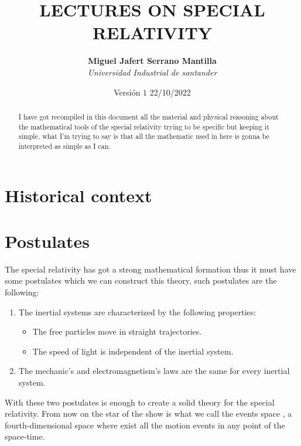 \documentclass[spanish,notitlepage,letterpaper,11pt]{article} %
\begin{document}
\title{ LECTURES ON SPECIAL RELATIVITY}
\author{
\textbf{Miguel Jafert Serrano Mantilla } \\ 
\textit{Universidad Industrial de santander} \\ }
\date{Versión $1$ 22/10/2022 }
\maketitle
\tableofcontents
\begin{abstract}
I have got recompiled in this document all the material and physical reasoning about the mathematical tools of the special relativity trying to be specific but keeping it simple, what I'm trying to say is that all the mathematic used in here is gonna be interpreted as simple as I can.

\end{abstract}
\section{Historical context}


\section{Postulates}

The special relativity has got a strong mathematical formation thus it must have some postulates which we can construct this theory, such postulates are the following:

\begin{enumerate}
    \item The inertial systems are characterized by the following properties: 
    
    \begin{itemize}
        \item The free particles move in straight trajectories. 
        \item The speed of light is independent of the inertial system.
    \end{itemize}
    
    \item The mechanic's and electromagnetism's laws are the same for every inertial system. 
\end{enumerate}

With these two postulates is enough to create a solid theory for the special relativity. From now on the star of the show is what we call the events space , a fourth-dimensional space where exist all the motion events in any point of the space-time.
\end{document}
